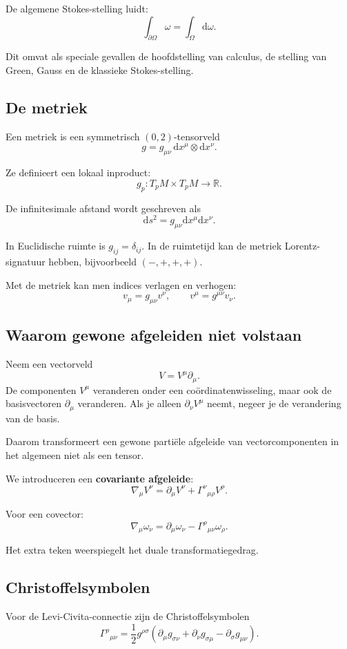 \documentclass[11pt,a4paper]{article}
\newcommand{\dd}{\mathrm{d}}
\newcommand{\R}{\mathbb{R}}
\begin{document}
De algemene Stokes-stelling luidt:
\[
\int_{\partial\Omega}\omega=\int_{\Omega}\dd\omega.
\]

Dit omvat als speciale gevallen de hoofdstelling van calculus, de stelling van Green, Gauss en de klassieke Stokes-stelling.

\subsection{De metriek}

Een metriek is een symmetrisch $(0,2)$-tensorveld
\[
g=g_{\mu\nu}\,\dd x^\mu\otimes\dd x^\nu.
\]

Ze definieert een lokaal inproduct:
\[
g_p:T_pM\times T_pM\to\R.
\]

De infinitesimale afstand wordt geschreven als
\[
\dd s^2=g_{\mu\nu}\dd x^\mu\dd x^\nu.
\]

In Euclidische ruimte is $g_{ij}=\delta_{ij}$. In de ruimtetijd kan de metriek Lorentz-signatuur hebben, bijvoorbeeld $(-,+,+,+)$.

Met de metriek kan men indices verlagen en verhogen:
\[
v_\mu=g_{\mu\nu}v^\nu,
\qquad
v^\mu=g^{\mu\nu}v_\nu.
\]

\subsection{Waarom gewone afgeleiden niet volstaan}

Neem een vectorveld
\[
V=V^\mu\partial_\mu.
\]
De componenten $V^\mu$ veranderen onder een coördinatenwisseling, maar ook de basisvectoren $\partial_\mu$ veranderen. Als je alleen $\partial_\nu V^\mu$ neemt, negeer je de verandering van de basis.

Daarom transformeert een gewone partiële afgeleide van vectorcomponenten in het algemeen niet als een tensor.

We introduceren een \textbf{covariante afgeleide}:
\[
\nabla_\mu V^\nu=\partial_\mu V^\nu+\Gamma^{\nu}{}_{\mu\rho}V^\rho.
\]

Voor een covector:
\[
\nabla_\mu \omega_\nu=\partial_\mu\omega_\nu-\Gamma^{\rho}{}_{\mu\nu}\omega_\rho.
\]

Het extra teken weerspiegelt het duale transformatiegedrag.

\subsection{Christoffelsymbolen}

Voor de Levi-Civita-connectie zijn de Christoffelsymbolen
\[
\Gamma^\rho{}_{\mu\nu}
=\frac12g^{\rho\sigma}
\left(
\partial_\mu g_{\sigma\nu}
+\partial_\nu g_{\sigma\mu}
-\partial_\sigma g_{\mu\nu}
\right).
\]
\end{document}
